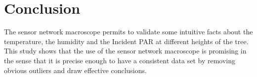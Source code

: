 \documentclass[11pt]{article}\usepackage[]{graphicx}\usepackage[]{color}
\begin{document}
\section{Conclusion}
The sensor network macroscope permits to validate some intuitive facts about the temperature, the humidity and the Incident PAR at different heights of the tree. This study shows that the use of the sensor network macroscope is promising in the sense that it is precise enough to have a consistent data set by removing obvious outliers and draw effective conclusions.





\end{document}
